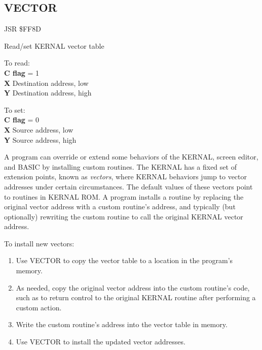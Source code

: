 \subsection{VECTOR}
\label{KERNAL Jump Table!VECTOR}
\begin{description}[leftmargin=2cm,style=nextline]
    \item [Address:] JSR \$FF8D
    \item [Description:] Read/set KERNAL vector table
    \item [Inputs:]
        To read: \\
        \textbf{C flag} = 1 \\
        \textbf{X} Destination address, low \\
        \textbf{Y} Destination address, high

        To set: \\
        \textbf{C flag} = 0 \\
        \textbf{X} Source address, low \\
        \textbf{Y} Source address, high

    \item [Remarks:]
        A program can override or extend some behaviors of the KERNAL, screen editor, and BASIC by installing custom routines. The KERNAL has a fixed set of extension points, known as \emph{vectors}, where KERNAL behaviors jump to vector addresses under certain circumstances. The default values of these vectors point to routines in KERNAL ROM. A program installs a routine by replacing the original vector address with a custom routine's address, and typically (but optionally) rewriting the custom routine to call the original KERNAL vector address.

        To install new vectors:

        \begin{enumerate}
            \item Use VECTOR to copy the vector table to a location in the program's memory.
            \item As needed, copy the original vector address into the custom routine's code, such as to return control to the original KERNAL routine after performing a custom action.
            \item Write the custom routine's address into the vector table in memory.
            \item Use VECTOR to install the updated vector addresses.
        \end{enumerate}


\end{description}
